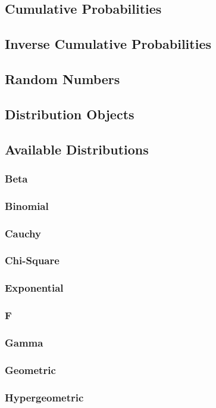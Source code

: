 \documentclass[12pt,a4paper]{article}
\begin{document}
\subsection{Cumulative Probabilities}
\subsection{Inverse Cumulative Probabilities}
\subsection{Random Numbers}
\subsection{Distribution Objects}
\subsection{Available Distributions}
\subsubsection{Beta}
\subsubsection{Binomial}
\subsubsection{Cauchy}
\subsubsection{Chi-Square}
\subsubsection{Exponential}
\subsubsection{F}
\subsubsection{Gamma}
\subsubsection{Geometric}
\subsubsection{Hypergeometric}
\end{document}
